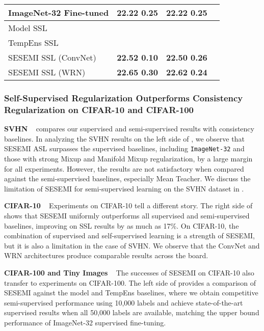 \documentclass{article}
\begin{document}
\begin{table}[t]
\begin{minipage}[t]{0.5\textwidth}
{\begin{tabular} {lrrr}
	ImageNet-32 Fine-tuned
                & \bfseries 22.22  0.25
				& \bfseries 22.22  0.25 \\
	\midrule
     Model SSL \cite{tempens}
				& 
				&  \\
	TempEns SSL \cite{tempens}
				& 
				&  \\
    SESEMI SSL (ConvNet)
                & \bfseries 22.52  0.10
                & \bfseries 22.50  0.26 \\
    SESEMI SSL (WRN)
                & \bfseries 22.65  0.30
                & \bfseries 22.62  0.24 \\
    \bottomrule
	\end{tabular}
	}
\end{minipage}
\end{table}

\subsubsection{Self-Supervised Regularization Outperforms Consistency Regularization on CIFAR-10 and CIFAR-100}

\textbf{SVHN} ~  compares our supervised and semi-supervised results with consistency baselines. In analyzing the SVHN results on the left side of , we observe that SESEMI ASL surpasses the supervised baselines, including \texttt{ImageNet-32} and those with strong Mixup \cite{mixup} and Manifold Mixup \cite{manifold-mixup} regularization, by a large margin for all experiments. However, the results are not satisfactory when compared against the semi-supervised baselines, especially Mean Teacher. We discuss the limitation of SESEMI for semi-supervised learning on the SVHN dataset in .

\textbf{CIFAR-10} ~ Experiments on CIFAR-10 tell a different story. The right side of  shows that SESEMI uniformly outperforms all supervised and semi-supervised baselines, improving on SSL results by as much as 17\%. On CIFAR-10, the combination of supervised and self-supervised learning is a strength of SESEMI, but it is also a limitation in the case of SVHN. We observe that the ConvNet and WRN architectures produce comparable results across the board.

\textbf{CIFAR-100 and Tiny Images} ~ The successes of SESEMI on CIFAR-10 also transfer to experiments on CIFAR-100. The left side of  provides a comparison of SESEMI against the  model and TempEns baselines, where we obtain competitive semi-supervised performance using 10,000 labels and achieve state-of-the-art supervised results when all 50,000 labels are available, matching the upper bound performance of ImageNet-32 supervised fine-tuning.
\end{document}
